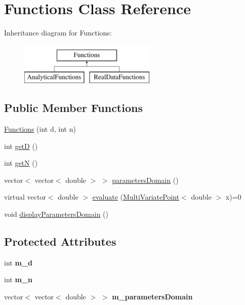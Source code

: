 \hypertarget{class_functions}{}\section{Functions Class Reference}
\label{class_functions}
Inheritance diagram for Functions\+:\begin{figure}[H]
\begin{center}
\leavevmode
\includegraphics[height=2.000000cm]{class_functions}
\end{center}
\end{figure}
\subsection*{Public Member Functions}
\begin{DoxyCompactItemize}
\item 
\hyperlink{class_functions_a8475b67a879039ddb2a388af82c7971c}{Functions} (int d, int n)
\item 
int \hyperlink{class_functions_a6eeb7f57bfc87abca793f66fb8f77b50}{getD} ()
\item 
int \hyperlink{class_functions_a5433e199ad59640867e411a14bc5c43b}{getN} ()
\item 
vector$<$ vector$<$ double $>$ $>$ \hyperlink{class_functions_a8b30e9e921042f95c7a8c550f4149477}{parameters\+Domain} ()
\item 
virtual vector$<$ double $>$ \hyperlink{class_functions_a9d7bad8a6adacd8bd184a85a245e6168}{evaluate} (\hyperlink{class_multi_variate_point}{Multi\+Variate\+Point}$<$ double $>$ x)=0
\item 
void \hyperlink{class_functions_a26606b4a1be61670b6a2bd00896f4797}{display\+Parameters\+Domain} ()
\end{DoxyCompactItemize}
\subsection*{Protected Attributes}
\begin{DoxyCompactItemize}
\item 
int {\bfseries m\+\_\+d}\hypertarget{class_functions_a5a63717950c9b8eb955fa1d728edeb33}{}\label{class_functions_a5a63717950c9b8eb955fa1d728edeb33}

\item 
int {\bfseries m\+\_\+n}\hypertarget{class_functions_a094dbe8643b4622fc20091a4275de215}{}\label{class_functions_a094dbe8643b4622fc20091a4275de215}

\item 
vector$<$ vector$<$ double $>$ $>$ {\bfseries m\+\_\+parameters\+Domain}\hypertarget{class_functions_a619b9753408b91bb9e4e455724824cb6}{}\label{class_functions_a619b9753408b91bb9e4e455724824cb6}

\end{DoxyCompactItemize}


